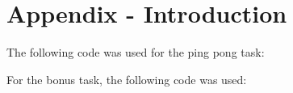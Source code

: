 \setcounter{section}{-1}
\section{Appendix - Introduction }
\label{app:pingpong}
The following code was used for the ping pong task:

For the bonus task, the following code was used:
